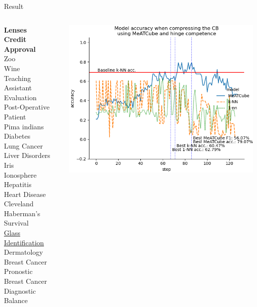 \documentclass[]{beamer}
\begin{document}
\begin{frame}{Result}
    \begin{columns}
        \begin{column}{.35\textwidth}
            {\smaller\smaller
            \textbf{Lenses} \\
            \textbf{Credit Approval} \\
            Zoo \\
            Wine \\
            Teaching Assistant Evaluation \\
            Post-Operative Patient \\
            Pima indians Diabetes \\
            Lung Cancer \\
            Liver Disorders \\
            Iris \\
            Ionosphere \\
            Hepatitis \\
            Heart Disease Cleveland \\
            Haberman's Survival \\
            \underline{Glass Identification} \\
            Dermatology \\
            Breast Cancer Pronostic \\
            Breast Cancer Diagnostic \\
            Balance\\
            ~}
        \end{column}
        \begin{column}{.65\textwidth}
            \includegraphics[width=.8\textwidth]{../results/figs/glass+identification.png}

\end{column}
\end{columns}
\end{frame}
\end{document}

